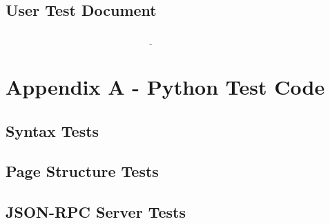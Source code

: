 \documentclass[10pt]{article}
\begin{document}
\subsection{User Test Document}
\begin{center}
$\underline{\hspace{5in}}$
\end{center}



\newpage

\section{Appendix A - Python Test Code}

\subsection{Syntax Tests}



\newpage

\subsection{Page Structure Tests}



\newpage

\subsection{JSON-RPC Server Tests}


\end{document}
